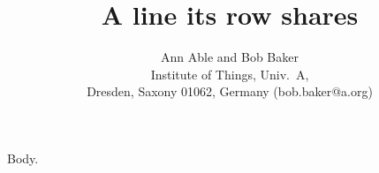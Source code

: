 \documentclass{article}
\begin{document}
\title{A line its row shares}
\author{Ann Able and Bob Baker\\ Institute of Things, Univ.\ A,\\ Dresden, Saxony 01062, Germany (bob.baker@a.org)}
\maketitle
Body.
\end{document}
